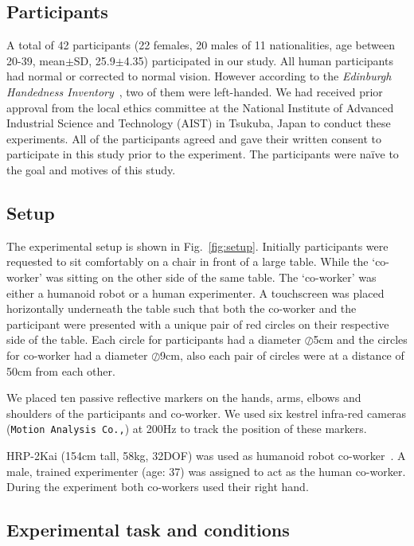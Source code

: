 \subsection{Participants}

A total of 42 participants (22 females, 20 males of 11 nationalities, age between 20-39, mean$\pm$SD, 25.9$\pm$4.35) participated in our study. All human participants had normal or corrected to normal vision. However according to the {\it Edinburgh Handedness Inventory}~\cite{robinson2013edinburgh}, two of them were left-handed. We had received prior approval from the local ethics committee at the National Institute of Advanced Industrial Science and Technology (AIST) in Tsukuba, Japan to conduct these experiments. All of the participants agreed and gave their written consent to participate in this study prior to the experiment. The participants were na{\"i}ve to the goal and motives of this study. 

\subsection{Setup}

The experimental setup is shown in Fig.~\ref{fig:setup}. Initially participants were requested to sit comfortably on a chair in front of a large table. While the `co-worker' was sitting on the other side of the same table. The `co-worker' was either a humanoid robot or a human experimenter. A touchscreen was placed horizontally underneath the table such that both the co-worker and the participant were presented with a unique pair of red circles on their respective side of the table. Each circle for participants had a diameter $\oslash$5cm and the circles for co-worker had a diameter $\oslash$9cm, also each pair of circles were at a distance of 50cm from each other. 

We placed ten passive reflective markers on the hands, arms, elbows and shoulders of the participants and co-worker. We used six kestrel infra-red cameras (\texttt{Motion Analysis Co.,}) at 200Hz to track the position of these markers.

HRP-2Kai (154cm tall, 58kg, 32DOF) was used as humanoid robot co-worker~\cite{Kaneko:RAS_ICHR:2015}. A male, trained experimenter (age: 37) was assigned to act as the human co-worker. During the experiment both co-workers used their right hand.

\subsection{Experimental task and conditions}

